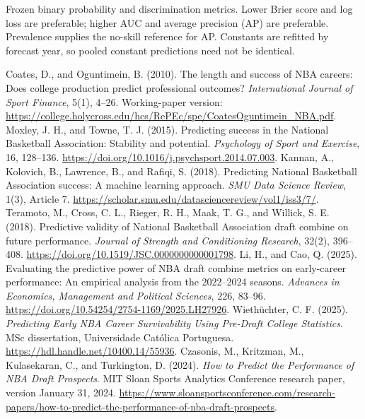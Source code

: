 \documentclass[11pt]{article}
\begin{document}
\begin{table}[htbp]
\centering\footnotesize\setlength{\tabcolsep}{3pt}
\caption{Frozen binary probability and discrimination metrics. Lower Brier score and log loss are preferable; higher AUC and average precision (AP) are preferable. Prevalence supplies the no-skill reference for AP. Constants are refitted by forecast year, so pooled constant predictions need not be identical.}
\end{table}

\clearpage
\raggedright
\begin{thebibliography}{99}
 Coates, D., and Oguntimein, B. (2010). The length and success of NBA careers: Does college production predict professional outcomes? \emph{International Journal of Sport Finance}, 5(1), 4--26. Working-paper version: \url{https://college.holycross.edu/hcs/RePEc/spe/CoatesOguntimein_NBA.pdf}.
 Moxley, J. H., and Towne, T. J. (2015). Predicting success in the National Basketball Association: Stability and potential. \emph{Psychology of Sport and Exercise}, 16, 128--136. \url{https://doi.org/10.1016/j.psychsport.2014.07.003}.
 Kannan, A., Kolovich, B., Lawrence, B., and Rafiqi, S. (2018). Predicting National Basketball Association success: A machine learning approach. \emph{SMU Data Science Review}, 1(3), Article 7. \url{https://scholar.smu.edu/datasciencereview/vol1/iss3/7/}.
 Teramoto, M., Cross, C. L., Rieger, R. H., Maak, T. G., and Willick, S. E. (2018). Predictive validity of National Basketball Association draft combine on future performance. \emph{Journal of Strength and Conditioning Research}, 32(2), 396--408. \url{https://doi.org/10.1519/JSC.0000000000001798}.
 Li, H., and Cao, Q. (2025). Evaluating the predictive power of NBA draft combine metrics on early-career performance: An empirical analysis from the 2022--2024 seasons. \emph{Advances in Economics, Management and Political Sciences}, 226, 83--96. \url{https://doi.org/10.54254/2754-1169/2025.LH27926}.
 Wieth\"uchter, C. F. (2025). \emph{Predicting Early NBA Career Survivability Using Pre-Draft College Statistics}. MSc dissertation, Universidade Cat\'olica Portuguesa. \url{https://hdl.handle.net/10400.14/55936}.
 Czasonis, M., Kritzman, M., Kulasekaran, C., and Turkington, D. (2024). \emph{How to Predict the Performance of NBA Draft Prospects}. MIT Sloan Sports Analytics Conference research paper, version January 31, 2024. \url{https://www.sloansportsconference.com/research-papers/how-to-predict-the-performance-of-nba-draft-prospects}.

\end{thebibliography}
\end{document}
